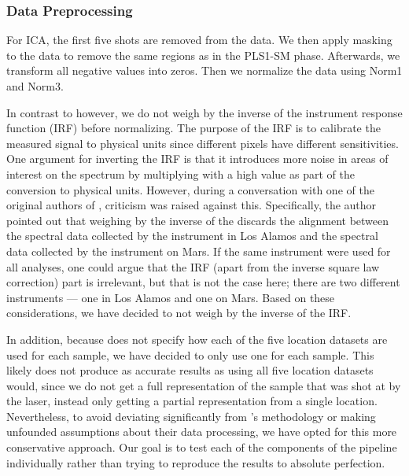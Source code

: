 \subsubsection{Data Preprocessing}\label{sec:ica_data_preprocessing}
For ICA, the first five shots are removed from the data.
We then apply masking to the data to remove the same regions as in the PLS1-SM phase.
Afterwards, we transform all negative values into zeros.
Then we normalize the data using Norm1 and Norm3.

In contrast to \citet{cleggRecalibrationMarsScience2017} however, we do not weigh by the inverse of the instrument response function (IRF) before normalizing.
The purpose of the IRF is to calibrate the measured signal to physical units since different pixels have different sensitivities\cite{wiensChemcam2012}.
One argument for inverting the IRF is that it introduces more noise in areas of interest on the spectrum by multiplying with a high value as part of the conversion to physical units.
However, during a conversation with one of the original authors of \citet{cleggRecalibrationMarsScience2017}, criticism was raised against this.
Specifically, the author pointed out that weighing by the inverse of the discards the alignment between the spectral data collected by the instrument in Los Alamos and the spectral data collected by the instrument on Mars.
If the same instrument were used for all analyses, one could argue that the IRF (apart from the inverse square law correction) part is irrelevant, but that is not the case here; there are two different instruments --- one in Los Alamos and one on Mars.
Based on these considerations, we have decided to not weigh by the inverse of the IRF.

In addition, because \citet{cleggRecalibrationMarsScience2017} does not specify how each of the five location datasets are used for each sample, we have decided to only use one for each sample.
This likely does not produce as accurate results as using all five location datasets would, since we do not get a full representation of the sample that was shot at by the laser, instead only getting a partial representation from a single location.
Nevertheless, to avoid deviating significantly from \citet{cleggRecalibrationMarsScience2017}'s methodology or making unfounded assumptions about their data processing, we have opted for this more conservative approach.
Our goal is to test each of the components of the pipeline individually rather than trying to reproduce the results to absolute perfection.

